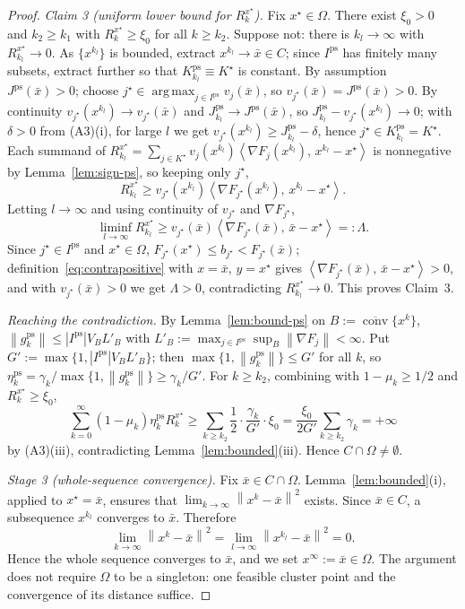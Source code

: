 \documentclass[]{interact}
\theoremstyle{plain}
\theoremstyle{definition}
\theoremstyle{remark}
\newcommand{\norm}[1]{\left\lVert #1 \right\rVert}
\newcommand{\abs}[1]{\left\lvert #1 \right\rvert}
\newcommand{\inner}[2]{\left\langle #1,\, #2 \right\rangle}
\DeclareMathOperator*{\argmax}{arg\,max}
\DeclareMathOperator{\conv}{conv}
\newcommand{\ps}{\mathrm{ps}}
\begin{document}
\begin{proof}
\smallskip
\emph{Claim 3 (uniform lower bound for $R^{x^\star}_k$).} Fix $x^\star\in\Omega$. There
exist $\xi_0>0$ and $k_2\ge k_1$ with $R^{x^\star}_k\ge\xi_0$ for all $k\ge k_2$. Suppose
not: there is $k_l\to\infty$ with $R^{x^\star}_{k_l}\to0$. As $\{x^{k_l}\}$ is bounded,
extract $x^{k_l}\to\bar x\in C$; since $I^{\ps}$ has finitely many subsets, extract
further so that $K^{\ps}_{k_l}\equiv K^\star$ is constant. By assumption
$J^{\ps}(\bar x)>0$; choose $j^\star\in\argmax_{j\in I^{\ps}}v_j(\bar x)$, so
$v_{j^\star}(\bar x)=J^{\ps}(\bar x)>0$. By continuity $v_{j^\star}(x^{k_l})\to
v_{j^\star}(\bar x)$ and $J^{\ps}_{k_l}\to J^{\ps}(\bar x)$, so
$J^{\ps}_{k_l}-v_{j^\star}(x^{k_l})\to0$; with $\delta>0$ from (A3)(i), for large $l$ we
get $v_{j^\star}(x^{k_l})\ge J^{\ps}_{k_l}-\delta$, hence $j^\star\in K^{\ps}_{k_l}=K^\star$.
Each summand of
$R^{x^\star}_{k_l}=\sum_{j\in K^\star}v_j(x^{k_l})\inner{\nabla F_j(x^{k_l})}{x^{k_l}-x^\star}$
is nonnegative by Lemma~\ref{lem:sign-ps}, so keeping only $j^\star$,
\[
R^{x^\star}_{k_l}\ge v_{j^\star}(x^{k_l})\inner{\nabla F_{j^\star}(x^{k_l})}{x^{k_l}-x^\star}.
\]
Letting $l\to\infty$ and using continuity of $v_{j^\star}$ and $\nabla F_{j^\star}$,
\[
\liminf_{l\to\infty}R^{x^\star}_{k_l}\ge v_{j^\star}(\bar x)\inner{\nabla F_{j^\star}(\bar x)}{\bar x-x^\star}=:\Lambda .
\]
Since $j^\star\in I^{\ps}$ and $x^\star\in\Omega$, $F_{j^\star}(x^\star)\le b_{j^\star}<F_{j^\star}(\bar x)$;
definition~\eqref{eq:contrapositive} with $x=\bar x$, $y=x^\star$ gives
$\inner{\nabla F_{j^\star}(\bar x)}{\bar x-x^\star}>0$, and with $v_{j^\star}(\bar x)>0$ we
get $\Lambda>0$, contradicting $R^{x^\star}_{k_l}\to0$. This proves Claim~3.

\smallskip
\emph{Reaching the contradiction.} By Lemma~\ref{lem:bound-ps} on
$B:=\overline{\conv}\{x^k\}$, $\norm{g^{\ps}_k}\le\abs{I^{\ps}}V_B L'_B$ with
$L'_B:=\max_{j\in I^{\ps}}\sup_B\norm{\nabla F_j}<\infty$. Put
$G':=\max\{1,\abs{I^{\ps}}V_B L'_B\}$; then $\max\{1,\norm{g^{\ps}_k}\}\le G'$ for all $k$,
so $\eta^{\ps}_k=\gamma_k/\max\{1,\norm{g^{\ps}_k}\}\ge\gamma_k/G'$. For $k\ge k_2$,
combining with $1-\mu_k\ge1/2$ and $R^{x^\star}_k\ge\xi_0$,
\[
\sum_{k=0}^\infty(1-\mu_k)\eta^{\ps}_k R^{x^\star}_k\ge\sum_{k\ge k_2}\frac12\cdot\frac{\gamma_k}{G'}\cdot\xi_0=\frac{\xi_0}{2G'}\sum_{k\ge k_2}\gamma_k=+\infty
\]
by (A3)(iii), contradicting Lemma~\ref{lem:bounded}(iii). Hence $C\cap\Omega\ne\emptyset$.

\emph{Stage 3 (whole-sequence convergence).} Fix $\bar x\in C\cap\Omega$.
Lemma~\ref{lem:bounded}(i), applied to $x^\star=\bar x$, ensures that
$\lim_{k\to\infty}\norm{x^k-\bar x}^2$ exists. Since $\bar x\in C$, a subsequence
$x^{k_l}$ converges to $\bar x$. Therefore
\[
\lim_{k\to\infty}\norm{x^k-\bar x}^2
=\lim_{l\to\infty}\norm{x^{k_l}-\bar x}^2=0.
\]
Hence the whole sequence converges to $\bar x$, and we set $x^\infty:=\bar x\in\Omega$.
The argument does not require $\Omega$ to be a singleton: one feasible cluster point and
the convergence of its distance suffice.
\end{proof}
\end{document}
